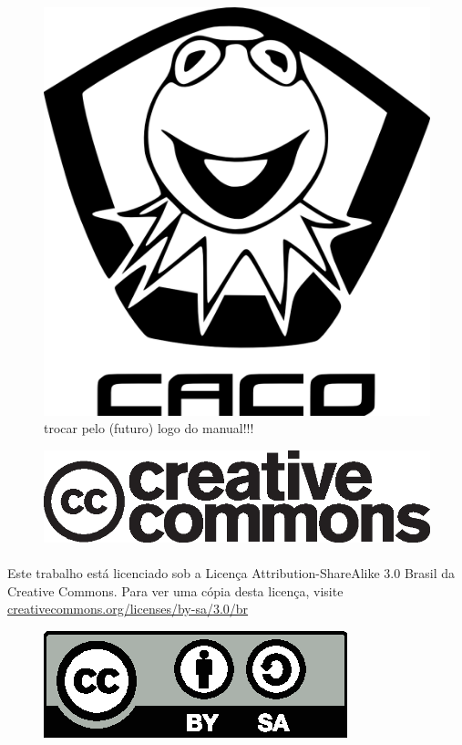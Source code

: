 \documentclass[a4paper,10pt]{book}
\begin{document}
\frontmatter
\begin{figure}[H]
    \vskip 50pt %
    \centering
    \includegraphics[width=.65\textwidth]{img/caco/logo.png}
    \caption{trocar pelo (futuro) logo do manual!!!}
\end{figure}

\vfill %

\begin{figure}[H]
    \centering
    \includegraphics[width=.5\textwidth]{img/cc-logo.eps}
\end{figure}

\paragraph{}
Este trabalho está licenciado sob a Licença Attribution-ShareAlike 3.0 Brasil da
Creative Commons. Para ver uma cópia desta licença, visite
\url{creativecommons.org/licenses/by-sa/3.0/br}

\begin{figure}[H]
    \centering
    \includegraphics[scale=.8]{img/by-sa.eps}
\end{figure}
\end{document}
